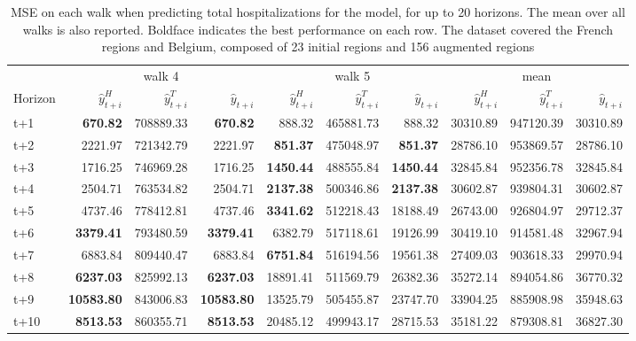 \begin{table}[H]
\centering
\caption{MSE on each walk when predicting total hospitalizations for the model, for up to 20 horizons. The mean over all walks is also reported. Boldface indicates the best performance on each row. The dataset covered the French regions and Belgium, composed of 23 initial regions and 156 augmented regions }
\label{tab:MSE_walk_assemble}
\begin{tabular}{lrrrrrrrrr}
\toprule
 & \multicolumn{3}{c}{walk 4} & \multicolumn{3}{c}{walk 5} & \multicolumn{3}{c}{mean} 
\\

\cmidrule(lr){2-4} \cmidrule(lr){5-7} \cmidrule(lr){8-10} 
Horizon & $\hat{y}_{t+i}^H$ & $\hat{y}_{t+i}^T$ & $\hat{y}_{t+i}$ & $\hat{y}_{t+i}^H$ & $\hat{y}_{t+i}^T$ & $\hat{y}_{t+i}$ & $\hat{y}_{t+i}^H$ & $\hat{y}_{t+i}^T$ & $\hat{y}_{t+i}$ \\
\midrule
t+1  & \textbf{670.82}  & 708889.33  & \textbf{670.82}  & 888.32  & 465881.73  & 888.32  & 30310.89  & 947120.39  & 30310.89  \\
t+2  & 2221.97  & 721342.79  & 2221.97  & \textbf{851.37}  & 475048.97  & \textbf{851.37}  & 28786.10  & 953869.57  & 28786.10  \\
t+3  & 1716.25  & 746969.28  & 1716.25  & \textbf{1450.44}  & 488555.84  & \textbf{1450.44}  & 32845.84  & 952356.78  & 32845.84  \\
t+4  & 2504.71  & 763534.82  & 2504.71  & \textbf{2137.38}  & 500346.86  & \textbf{2137.38}  & 30602.87  & 939804.31  & 30602.87  \\
t+5  & 4737.46  & 778412.81  & 4737.46  & \textbf{3341.62}  & 512218.43  & 18188.49  & 26743.00  & 926804.97  & 29712.37  \\
t+6  & \textbf{3379.41}  & 793480.59  & \textbf{3379.41}  & 6382.79  & 517118.61  & 19126.99  & 30419.10  & 914581.48  & 32967.94  \\
t+7  & 6883.84  & 809440.47  & 6883.84  & \textbf{6751.84}  & 516194.56  & 19561.38  & 27409.03  & 903618.33  & 29970.94  \\
t+8  & \textbf{6237.03}  & 825992.13  & \textbf{6237.03}  & 18891.41  & 511569.79  & 26382.36  & 35272.14  & 894054.86  & 36770.32  \\
t+9  & \textbf{10583.80}  & 843006.83  & \textbf{10583.80}  & 13525.79  & 505455.87  & 23747.70  & 33904.25  & 885908.98  & 35948.63  \\
t+10  & \textbf{8513.53}  & 860355.71  & \textbf{8513.53}  & 20485.12  & 499943.17  & 28715.53  & 35181.22  & 879308.81  & 36827.30  \\

\end{tabular}
\end{table}
